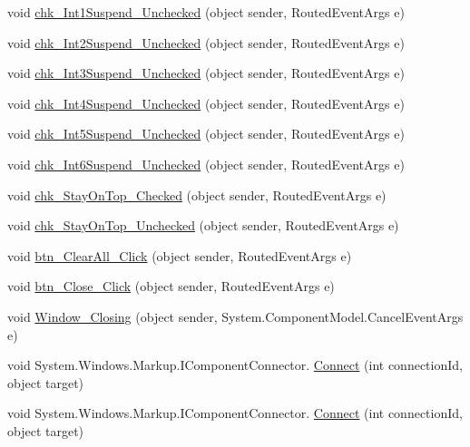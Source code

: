 \begin{DoxyCompactItemize}
\item 
void \hyperlink{class_c_p_u___o_s___simulator_1_1_interrupts_window_a5d88087df4be9980a0f486a7dc5305e1}{chk\+\_\+\+Int1\+Suspend\+\_\+\+Unchecked} (object sender, Routed\+Event\+Args e)
\item 
void \hyperlink{class_c_p_u___o_s___simulator_1_1_interrupts_window_a7f8c2c2ffa1f1b07f3c0a08be6b16b83}{chk\+\_\+\+Int2\+Suspend\+\_\+\+Unchecked} (object sender, Routed\+Event\+Args e)
\item 
void \hyperlink{class_c_p_u___o_s___simulator_1_1_interrupts_window_ab4a13c8940d2c8bae88fad25345d3b67}{chk\+\_\+\+Int3\+Suspend\+\_\+\+Unchecked} (object sender, Routed\+Event\+Args e)
\item 
void \hyperlink{class_c_p_u___o_s___simulator_1_1_interrupts_window_ad40945eeb8fc8bdcd47b66903a29c616}{chk\+\_\+\+Int4\+Suspend\+\_\+\+Unchecked} (object sender, Routed\+Event\+Args e)
\item 
void \hyperlink{class_c_p_u___o_s___simulator_1_1_interrupts_window_a96b86de081b2935d11992beb0a17ecd2}{chk\+\_\+\+Int5\+Suspend\+\_\+\+Unchecked} (object sender, Routed\+Event\+Args e)
\item 
void \hyperlink{class_c_p_u___o_s___simulator_1_1_interrupts_window_a96b4c47593f3d351a8eac78be161db4d}{chk\+\_\+\+Int6\+Suspend\+\_\+\+Unchecked} (object sender, Routed\+Event\+Args e)
\item 
void \hyperlink{class_c_p_u___o_s___simulator_1_1_interrupts_window_aed1373635468e69998483d0fb6d71532}{chk\+\_\+\+Stay\+On\+Top\+\_\+\+Checked} (object sender, Routed\+Event\+Args e)
\item 
void \hyperlink{class_c_p_u___o_s___simulator_1_1_interrupts_window_ae2e48ca5e01cef60ce00286a5fafe39e}{chk\+\_\+\+Stay\+On\+Top\+\_\+\+Unchecked} (object sender, Routed\+Event\+Args e)
\item 
void \hyperlink{class_c_p_u___o_s___simulator_1_1_interrupts_window_ac1aa7179c5b7441acd2ee044fdc336a5}{btn\+\_\+\+Clear\+All\+\_\+\+Click} (object sender, Routed\+Event\+Args e)
\item 
void \hyperlink{class_c_p_u___o_s___simulator_1_1_interrupts_window_a8f21c59517e0917aaaa93d7505b93c66}{btn\+\_\+\+Close\+\_\+\+Click} (object sender, Routed\+Event\+Args e)
\item 
void \hyperlink{class_c_p_u___o_s___simulator_1_1_interrupts_window_af6f34e936300585c990ac1b7fcd49b5a}{Window\+\_\+\+Closing} (object sender, System.\+Component\+Model.\+Cancel\+Event\+Args e)
\item 
void System.\+Windows.\+Markup.\+I\+Component\+Connector. \hyperlink{class_c_p_u___o_s___simulator_1_1_interrupts_window_a262659d1dfd0fb281ac14dafa195077a}{Connect} (int connection\+Id, object target)
\item 
void System.\+Windows.\+Markup.\+I\+Component\+Connector. \hyperlink{class_c_p_u___o_s___simulator_1_1_interrupts_window_a262659d1dfd0fb281ac14dafa195077a}{Connect} (int connection\+Id, object target)
\end{DoxyCompactItemize}
